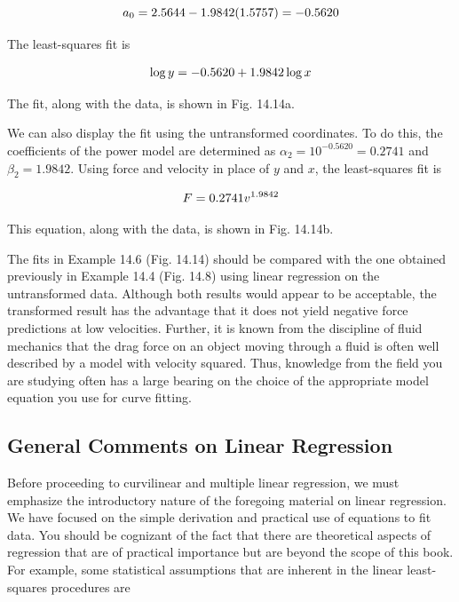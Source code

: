 \documentclass[../main.tex]{subfiles}
\begin{document}
\begin{example}
	\begin{equation}
		\notag
		a_0 = 2.5644 - 1.9842(1.5757) = -0.5620
	\end{equation}

	\noindent The least-squares fit is

	\begin{equation}
		\notag
		\log y = -0.5620 + 1.9842 \log x
	\end{equation}

	\noindent The fit, along with the data, is shown in Fig. 14.14a.

	We can also display the fit using the untransformed coordinates. To do this, the coefficients of the power model are determined as $\alpha_2 = 10^{-0.5620} = 0.2741$ and $\beta_2 = 1.9842$. Using force and velocity in place of $y$ and $x$, the least-squares fit is

	\begin{equation}
		\notag
		F = 0.2741 v ^ {1.9842}		
	\end{equation}

	\noindent This equation, along with the data, is shown in Fig. 14.14b.
\end{example}


The fits in Example 14.6 (Fig. 14.14) should be compared with the one obtained previously in Example 14.4 (Fig. 14.8) using linear regression on the untransformed data. Although both results would appear to be acceptable, the transformed result has the advantage that it does not yield negative force predictions at low velocities. Further, it is known from the discipline of fluid mechanics that the drag force on an object moving through a fluid is often well described by a model with velocity squared. Thus, knowledge from the field you are studying often has a large bearing on the choice of the appropriate model equation you use for curve fitting.


\label{cha:cha_P_14_4_1}
\subsection{General Comments on Linear Regression}

\noindent Before proceeding to curvilinear and multiple linear regression, we must emphasize the introductory nature of the foregoing material on linear regression. We have focused on the simple derivation and practical use of equations to fit data. You should be cognizant of the fact that there are theoretical aspects of regression that are of practical importance but are beyond the scope of this book. For example, some statistical assumptions that are inherent in the linear least-squares procedures are
\end{document}
